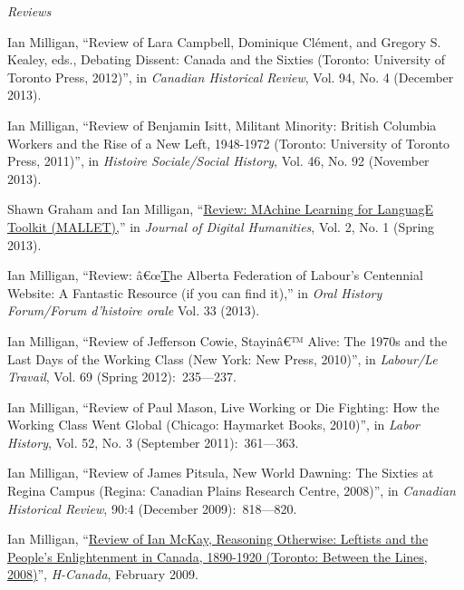 \documentclass[11pt,article,oneside]{memoir}
\begin{document}
\bigskip 

\noindent\emph{Reviews \vspace{0.05in}}


\ind Ian Milligan, ``Review of Lara Campbell, Dominique Cl\'ement, and Gregory S. Kealey, eds., Debating Dissent: Canada and the Sixties (Toronto: University of Toronto Press, 2012)'', in \emph{Canadian Historical Review}, Vol. 94, No. 4 (December 2013).

\ind Ian Milligan, ``Review of Benjamin Isitt, Militant Minority: British Columbia Workers and the Rise of a New Left, 1948-1972 (Toronto: University of Toronto Press, 2011)'', in \emph{Histoire Sociale/Social History}, Vol. 46, No. 92 (November 2013).

\ind Shawn Graham and Ian Milligan, ``\href{http://journalofdigitalhumanities.org/2-1/review-mallet-by-ian-milligan-and-shawn-graham/}{Review: MAchine Learning for LanguagE Toolkit (MALLET),}'' in \emph{Journal of Digital Humanities}, Vol. 2, No. 1 (Spring 2013).

\ind Ian Milligan, ``Review: â€œ\href{http://www.oralhistoryforum.ca/index.php/ohf/article/view/467/545}The Alberta Federation of Labour's Centennial Website: A Fantastic Resource (if you can find it),'' in \emph{Oral History Forum/Forum d'histoire orale} Vol. 33 (2013).

\ind Ian Milligan, ``Review of Jefferson Cowie, Stayinâ€™ Alive: The 1970s and the Last Days of the Working Class (New York: New Press, 2010)'', in \emph{Labour/Le Travail}, Vol. 69 (Spring 2012):~235---237.

\ind Ian Milligan, ``Review of Paul Mason, Live Working or Die Fighting: How the Working Class Went Global (Chicago: Haymarket Books, 2010)'', in \emph{Labor History}, Vol. 52, No. 3 (September 2011):~361---363.

\ind Ian Milligan, ``Review of James Pitsula, New World Dawning: The Sixties at Regina Campus (Regina: Canadian Plains Research Centre, 2008)'', in \emph{Canadian Historical Review}, 90:4 (December 2009):~818---820.

\ind Ian Milligan, ``\href{http://www.h-net.org/reviews/showrev.php?id=24198}{Review of Ian McKay, Reasoning Otherwise: Leftists and the People's Enlightenment in Canada, 1890-1920 (Toronto: Between the Lines, 2008)}'', \emph{H-Canada}, February 2009.
\end{document}
